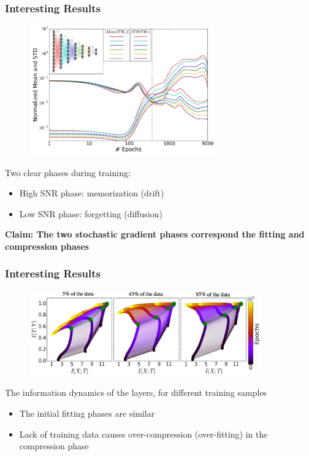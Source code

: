 \documentclass{beamer}
\begin{document}
\begin{frame}
    \frametitle{Interesting Results}
    \vspace{-0.25cm}
    \begin{figure}
        \centering
        \includegraphics[width=8cm]{mean_std.jpg}
    \end{figure}
    \vspace{-0.4cm}
    Two clear phases during training: 
    \begin{itemize}
        \item High SNR phase: memorization (drift)
        \item Low SNR phase: forgetting (diffusion)
    \end{itemize}
    \textbf{Claim: The two stochastic gradient phases correspond the fitting and compression phases}
\end{frame}

\begin{frame}
    \frametitle{Interesting Results}
    \begin{figure}
        \centering
        \includegraphics[width=10cm]{info_plane_data.jpg}
    \end{figure}
    The information dynamics of the layers, for different training samples
    \begin{itemize}
        \item The initial fitting phases are similar
        \item Lack of training data causes over-compression (over-fitting) in the compression phase
    \end{itemize}
\end{frame}
\end{document}
